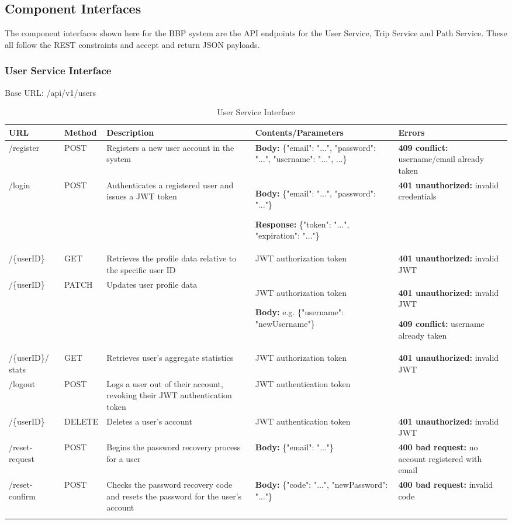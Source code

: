\subsection{Component Interfaces}
The component interfaces shown here for the BBP system are the API endpoints for the User Service, Trip Service 
and Path Service. These all follow the REST constraints and accept and return JSON payloads.

\subsubsection{User Service Interface}
Base URL: /api/v1/users
\begin{longtable}{|p{1.5cm}|p{1.3cm}|p{4cm}|p{4cm}|p{3.5cm}|}
   \hline
   \textbf{URL} & \textbf{Method} & \textbf{Description} & \textbf{Contents/Parameters} & \textbf{Errors} \\ \hline
   \endhead
   /register & POST & Registers a new user account in the system & \textbf{Body:} \{"email": "...", "password": "...", "username": "...", ...\} & \textbf{409 conflict:} username/email already taken \\
   \hline
   /login & POST & Authenticates a registered user and issues a JWT token & \textbf{Body:} \{"email": "...", "password": "..."\}
   
   \textbf{Response:} \{"token": "...", "expiration": "..."\} & \textbf{401 unauthorized:} invalid credentials \\
   \hline
   /\{userID\} & GET & Retrieves the profile data relative to the specific user ID & JWT authorization token & \textbf{401 unauthorized:} invalid JWT \\
   \hline
   /\{userID\} & PATCH & Updates user profile data & JWT authorization token
   
   \textbf{Body:} e.g. \{"username": "newUsername"\} & \textbf{401 unauthorized:} invalid JWT
   
   \textbf{409 conflict:} username already taken\\
   \hline
   /\{userID\}/ stats & GET & Retrieves user's aggregate statistics & JWT authorization token & \textbf{401 unauthorized:} invalid JWT\\
   \hline
   /logout & POST & Logs a user out of their account, revoking their JWT authentication token & JWT authentication token & \\
   \hline
   /\{userID\} & DELETE & Deletes a user's account & JWT authentication token & \textbf{401 unauthorized:} invalid JWT \\
   \hline
   /reset-request & POST & Begins the password recovery process for a user & \textbf{Body:} \{"email": "..."\} & \textbf{400 bad request:} no account registered with email \\
   \hline
   /reset-confirm & POST & Checks the password recovery code and resets the password for the user's account & \textbf{Body:} \{"code": "...", "newPassword": "..."\} & \textbf{400 bad request:} invalid code \\
   \hline
   \caption[]{User Service Interface}
\end{longtable}
\newpage
